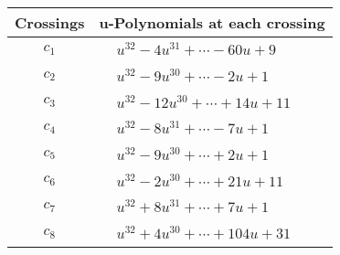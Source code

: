 \documentclass[1p]{elsarticle_modified}
\theoremstyle{definition}
\begin{document}
\begin{tabular}{m{50pt}|m{274pt}}
Crossings & \hspace{64pt}u-Polynomials at each crossing \\
\hline $$\begin{aligned}c_{1}\end{aligned}$$&$\begin{aligned}
&u^{32}-4 u^{31}+\cdots-60 u+9
\end{aligned}$\\
\hline $$\begin{aligned}c_{2}\end{aligned}$$&$\begin{aligned}
&u^{32}-9 u^{30}+\cdots-2 u+1
\end{aligned}$\\
\hline $$\begin{aligned}c_{3}\end{aligned}$$&$\begin{aligned}
&u^{32}-12 u^{30}+\cdots+14 u+11
\end{aligned}$\\
\hline $$\begin{aligned}c_{4}\end{aligned}$$&$\begin{aligned}
&u^{32}-8 u^{31}+\cdots-7 u+1
\end{aligned}$\\
\hline $$\begin{aligned}c_{5}\end{aligned}$$&$\begin{aligned}
&u^{32}-9 u^{30}+\cdots+2 u+1
\end{aligned}$\\
\hline $$\begin{aligned}c_{6}\end{aligned}$$&$\begin{aligned}
&u^{32}-2 u^{30}+\cdots+21 u+11
\end{aligned}$\\
\hline $$\begin{aligned}c_{7}\end{aligned}$$&$\begin{aligned}
&u^{32}+8 u^{31}+\cdots+7 u+1
\end{aligned}$\\
\hline $$\begin{aligned}c_{8}\end{aligned}$$&$\begin{aligned}
&u^{32}+4 u^{30}+\cdots+104 u+31
\end{aligned}$\\

\end{tabular}
\end{document}
